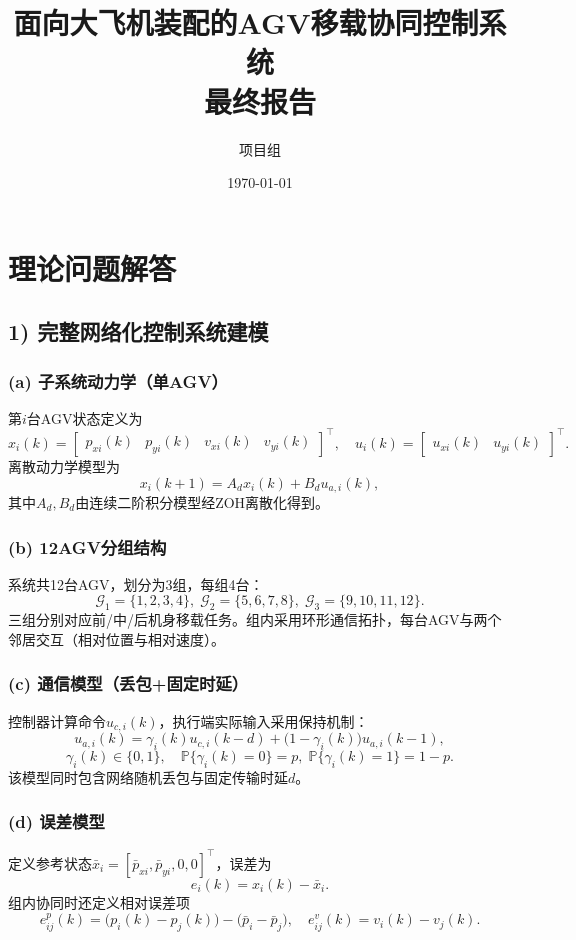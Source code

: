 \documentclass[12pt,a4paper]{article}
\title{面向大飞机装配的AGV移载协同控制系统\\最终报告}
\author{项目组}
\date{\today}
\begin{document}
\maketitle
\tableofcontents
\newpage

\section{理论问题解答}

\subsection{1) 完整网络化控制系统建模}
\subsubsection*{(a) 子系统动力学（单AGV）}
第$i$台AGV状态定义为
\[
x_i(k)=\begin{bmatrix}p_{xi}(k) & p_{yi}(k) & v_{xi}(k) & v_{yi}(k)\end{bmatrix}^\top,\quad
u_i(k)=\begin{bmatrix}u_{xi}(k) & u_{yi}(k)\end{bmatrix}^\top.
\]
离散动力学模型为
\[
x_i(k+1)=A_d x_i(k)+B_d u_{a,i}(k),
\]
其中$A_d,B_d$由连续二阶积分模型经ZOH离散化得到。

\subsubsection*{(b) 12AGV分组结构}
系统共12台AGV，划分为3组，每组4台：
\[
\mathcal{G}_1=\{1,2,3,4\},\;
\mathcal{G}_2=\{5,6,7,8\},\;
\mathcal{G}_3=\{9,10,11,12\}.
\]
三组分别对应前/中/后机身移载任务。组内采用环形通信拓扑，每台AGV与两个邻居交互（相对位置与相对速度）。

\subsubsection*{(c) 通信模型（丢包+固定时延）}
控制器计算命令$u_{c,i}(k)$，执行端实际输入采用保持机制：
\[
u_{a,i}(k)=\gamma_i(k)u_{c,i}(k-d)+\big(1-\gamma_i(k)\big)u_{a,i}(k-1),
\]
\[
\gamma_i(k)\in\{0,1\},\quad
\mathbb{P}\{\gamma_i(k)=0\}=p,\;\mathbb{P}\{\gamma_i(k)=1\}=1-p.
\]
该模型同时包含网络随机丢包与固定传输时延$d$。

\subsubsection*{(d) 误差模型}
定义参考状态$\bar x_i=[\bar p_{xi},\bar p_{yi},0,0]^\top$，误差为
\[
e_i(k)=x_i(k)-\bar x_i.
\]
组内协同时还定义相对误差项
\[
e^{p}_{ij}(k)=\big(p_i(k)-p_j(k)\big)-\big(\bar p_i-\bar p_j\big),\quad
e^{v}_{ij}(k)=v_i(k)-v_j(k).
\]
\end{document}
